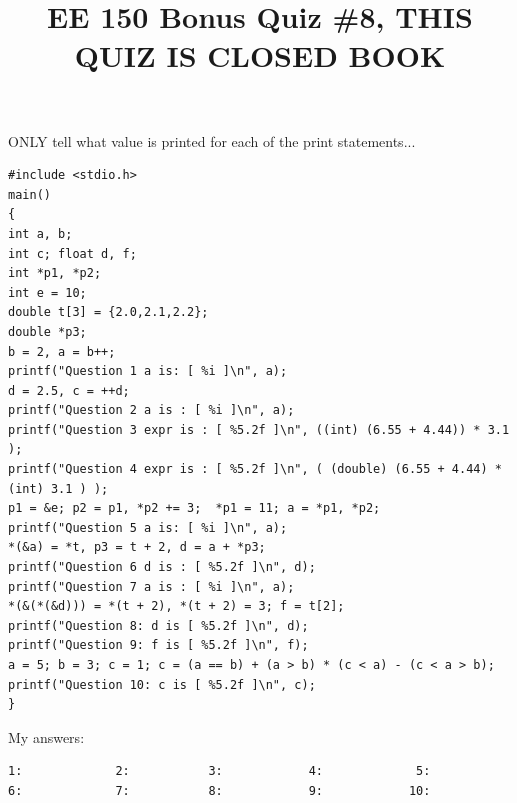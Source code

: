 \setcounter{page}{1}



\title{EE 150 {\bf Bonus} Quiz \#8, {\large THIS QUIZ IS {\bf CLOSED} BOOK}}
\author{}
\date{}
\maketitle

ONLY tell what value is printed for each of the print statements...
\begin{verbatim}
#include <stdio.h>
main()
{
int a, b;
int c; float d, f;
int *p1, *p2;  
int e = 10; 
double t[3] = {2.0,2.1,2.2};
double *p3;
b = 2, a = b++;
printf("Question 1 a is: [ %i ]\n", a); 
d = 2.5, c = ++d;
printf("Question 2 a is : [ %i ]\n", a); 
printf("Question 3 expr is : [ %5.2f ]\n", ((int) (6.55 + 4.44)) * 3.1 );
printf("Question 4 expr is : [ %5.2f ]\n", ( (double) (6.55 + 4.44) * (int) 3.1 ) );
p1 = &e; p2 = p1, *p2 += 3;  *p1 = 11; a = *p1, *p2;  
printf("Question 5 a is: [ %i ]\n", a);
*(&a) = *t, p3 = t + 2, d = a + *p3;
printf("Question 6 d is : [ %5.2f ]\n", d);
printf("Question 7 a is : [ %i ]\n", a);
*(&(*(&d))) = *(t + 2), *(t + 2) = 3; f = t[2];
printf("Question 8: d is [ %5.2f ]\n", d);
printf("Question 9: f is [ %5.2f ]\n", f);
a = 5; b = 3; c = 1; c = (a == b) + (a > b) * (c < a) - (c < a > b);
printf("Question 10: c is [ %5.2f ]\n", c);
}
\end{verbatim}

My answers:
\begin{verbatim}
1:             2:           3:            4:             5:
6:             7:           8:            9:            10:
\end{verbatim}



